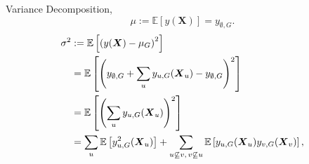 \begin{frame}{Variance Decomposition, \cite{sobol1993sensitivity}}
    \[
    \mu := \mathbb{E}[y(\boldsymbol{X})] = y_{\emptyset,G}.
    \]
    \begin{align*}
\sigma^2 
&:= \mathbb{E}\left[ \left( y(\boldsymbol{X}) - \mu_G \right)^2 \right] \notag \\
&= \mathbb{E} \left[ \left( y_{\emptyset,G} + \sum_{u} y_{u,G}(\boldsymbol{X}_u) - y_{\emptyset,G} \right)^2 \right] \notag \\
&= \mathbb{E} \left[ \left( \sum_{u} y_{u,G}(\boldsymbol{X}_u) \right)^2 \right] \notag \\
&= \sum_{u} \mathbb{E} \left[ y_{u,G}^2(\boldsymbol{X}_u) \right]
+ \sum_{\substack{u \not\subseteq v,\, v \not\subseteq u}} 
\mathbb{E} \left[ y_{u,G}(\boldsymbol{X}_u) y_{v,G}(\boldsymbol{X}_v) \right],
\end{align*}
    
\end{frame}

